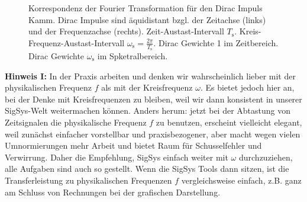 \begin{figure}[h!]
\centering
%
%
%
%
\caption{Korrespondenz der Fourier Transformation für den Dirac Impuls Kamm.
Dirac Impulse sind äquidistant bzgl. der Zeitachse (links) und
der Frequenzachse (rechts). Zeit-Austast-Intervall $T_\mathrm{s}$.
Kreis-Frequenz-Austast-Intervall $\omega_\textrm{s}=\frac{2\pi}{T_\mathrm{s}}$.
%
Dirac Gewichte 1 im Zeitbereich. Dirac Gewichte $\omega_\text{s}$ im Spketralbereich.}
\label{fig:DiracImpulsKammSkizze}
\end{figure}


\textbf{Hinweis I:} In der Praxis arbeiten und denken wir wahrscheinlich
lieber mit der physikalischen
Frequenz $f$ als mit der Kreisfrequenz $\omega$. Es bietet jedoch hier an, bei der Denke
mit Kreisfrequenzen zu bleiben, weil wir dann konsistent in unserer SigSys-Welt
weitermachen können. Anders herum: jetzt bei der Abtastung von Zeitsignalen
die physikalische Frequenz $f$ zu benutzen, erscheint vielleicht elegant,
weil zunächst einfacher vorstellbar und praxisbezogener,
aber macht wegen vielen Umnormierungen mehr Arbeit und bietet Raum für
Schusselfehler und Verwirrung.
Daher die Empfehlung, SigSys einfach weiter mit $\omega$ durchzuziehen,
alle Aufgaben sind auch so gestellt. Wenn die SigSys Tools dann sitzen, ist die
Transferleistung zu physikalischen Frequenzen $f$ vergleichsweise einfach, z.B.
ganz am Schluss von Rechnungen bei der grafischen Darstellung.


